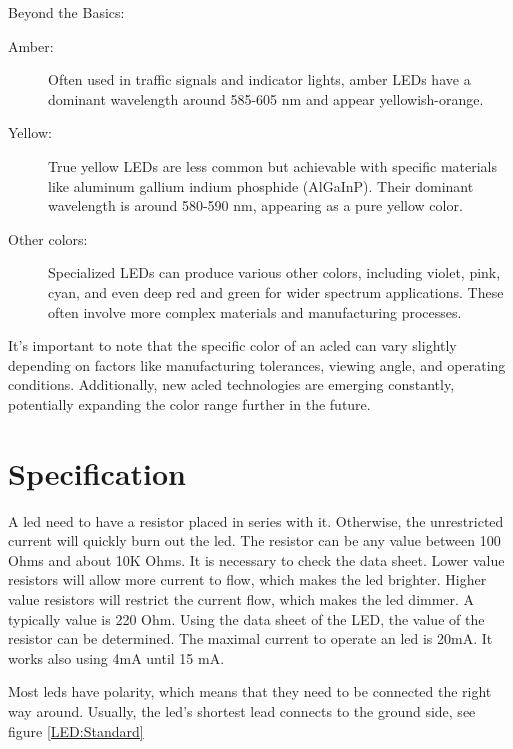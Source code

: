 \medskip


Beyond the Basics:

\begin{description}
  \item [Amber:] Often used in traffic signals and indicator lights, amber LEDs have a dominant wavelength around 585-605 nm and appear yellowish-orange.
  \item [Yellow:] True yellow LEDs are less common but achievable with specific materials like aluminum gallium indium phosphide (AlGaInP). Their dominant wavelength is around 580-590 nm, appearing as a pure yellow color.
  \item [Other colors:] Specialized LEDs can produce various other colors, including violet, pink, cyan, and even deep red and green for wider spectrum applications. These often involve more complex materials and manufacturing processes.
\end{description}

It's important to note that the specific color of an ac{led} can vary slightly depending on factors like manufacturing tolerances, viewing angle, and operating conditions. Additionally, new ac{led} technologies are emerging constantly, potentially expanding the color range further in the future.
\cite{Kainka:2009, Hering:2021,Hering:2023,Baichtal:2018}




\section{Specification}    


A \ac{led} need to have a resistor placed in series with it. Otherwise, the unrestricted current will quickly burn out the \ac{led}. The resistor can be any value between 100 Ohms and about 10K Ohms. It is necessary to check the data sheet. Lower value resistors will allow more current to flow, which makes the \ac{led} brighter. Higher value resistors will restrict the current flow, which makes the \ac{led} dimmer. A typically value is 220 Ohm. Using the data sheet of the LED, the value of the resistor can be determined. \cite{Quadrios:2020,Huiyuan:2017}
The maximal current to operate an \ac{led} is 20mA. It works also using 4mA until 15 mA. \cite{Quadrios:2020}


Most \ac{led}s have polarity, which means that they need to be connected the right way around. Usually, the \ac{led}'s shortest lead connects to the ground side, see figure \ref{LED:Standard}

